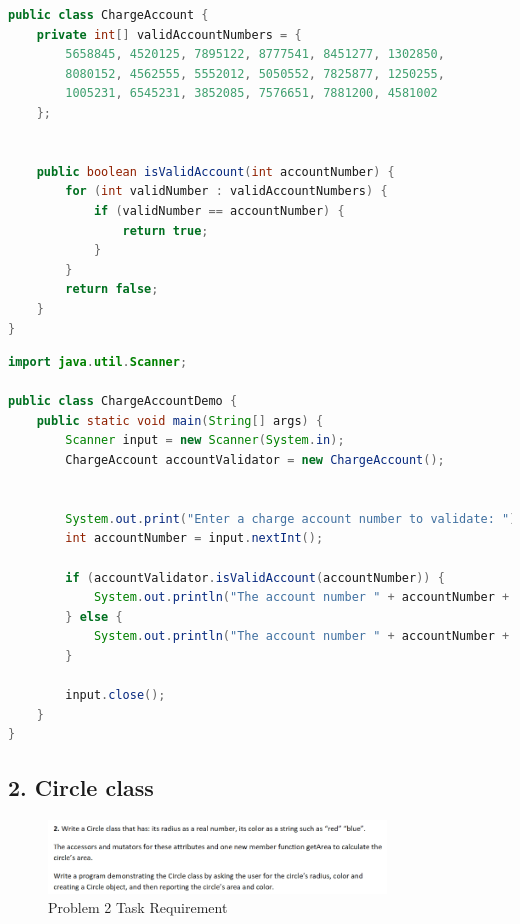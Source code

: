 \documentclass{article}
\begin{document}
\begin{lstlisting}[language=Java,caption=ChargeAccount.java]
public class ChargeAccount {
    private int[] validAccountNumbers = {
        5658845, 4520125, 7895122, 8777541, 8451277, 1302850,
        8080152, 4562555, 5552012, 5050552, 7825877, 1250255,
        1005231, 6545231, 3852085, 7576651, 7881200, 4581002
    };


    public boolean isValidAccount(int accountNumber) {
        for (int validNumber : validAccountNumbers) {
            if (validNumber == accountNumber) {
                return true;
            }
        }
        return false;
    }
}
\end{lstlisting}

\begin{lstlisting}[language=Java, caption=ChargeAccountDemo.java]
import java.util.Scanner;

public class ChargeAccountDemo {
    public static void main(String[] args) {
        Scanner input = new Scanner(System.in);
        ChargeAccount accountValidator = new ChargeAccount();


        System.out.print("Enter a charge account number to validate: ");
        int accountNumber = input.nextInt();

        if (accountValidator.isValidAccount(accountNumber)) {
            System.out.println("The account number " + accountNumber + " is VALID.");
        } else {
            System.out.println("The account number " + accountNumber + " is INVALID.");
        }

        input.close();
    }
}
\end{lstlisting}

\subsection*{2. Circle class}

\begin{figure}[H]
    \centering
    \includegraphics[width=0.8\textwidth]{./Assets/Task requirements/Assignment8/2.png}
    \caption{Problem 2 Task Requirement}
\end{figure}
\end{document}
